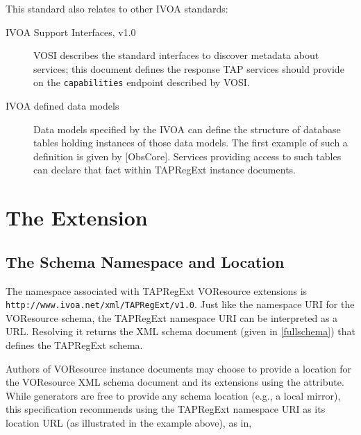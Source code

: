 \documentclass{ivoa}
\begin{document}
This standard also relates to other IVOA standards:


\begin{description}
\item[IVOA Support Interfaces, v1.0 \citep{std:VOSI}] VOSI describes the standard interfaces to discover metadata about
services; this document defines the response TAP services should
provide on the \texttt{capabilities} endpoint described by VOSI.
\item[IVOA defined data models]Data models specified by the IVOA can define the structure of
database tables holding instances of those data models.
The first example of such a definition is given by
\citep{std:OBSCORE}{[ObsCore]}.  Services providing
access to such tables
can declare that fact within TAPRegExt instance documents.

\end{description}







\section{The Extension}

\label{taextension}

\subsection{The Schema Namespace and Location}

\label{nsloc}

The namespace associated with TAPRegExt VOResource extensions is
\texttt{http://www.ivoa.net/xml/TAPRegExt/v1.0}.  
Just like the namespace URI for the VOResource schema, the
TAPRegExt namespace URI can be interpreted as a URL.  Resolving it
returns the XML schema document (given in \ref{fullschema})
that defines the TAPRegExt schema.

Authors of VOResource instance documents may choose to
provide a location for the VOResource XML schema document and its
extensions using the
 attribute.  
While generators are
free to provide any schema location (e.g., a local mirror), this specification
recommends using the TAPRegExt namespace URI as its location URL
(as illustrated in the example above), as in,
\end{document}
